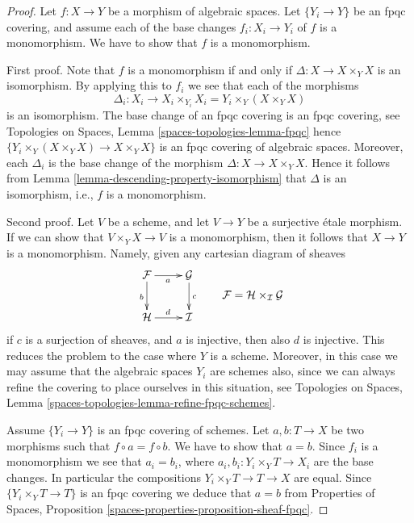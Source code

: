 \documentclass{stacks-project}
\theoremstyle{plain}
\theoremstyle{definition}
\theoremstyle{remark}
\numberwithin{equation}{subsection}
\begin{document}
\begin{proof}
Let $f : X \to Y$ be a morphism of algebraic spaces.
Let $\{Y_i \to Y\}$ be an fpqc covering, and assume
each of the base changes $f_i : X_i \to Y_i$ of $f$ is
a monomorphism. We have to show that $f$ is a monomorphism.

\medskip\noindent
First proof. Note that $f$ is a monomorphism if and only if
$\Delta : X \to X \times_Y X$ is an isomorphism. By applying this to
$f_i$ we see that each of the morphisms
$$
\Delta_i :
X_i
\longrightarrow
X_i \times_{Y_i} X_i = Y_i \times_Y (X \times_Y X)
$$
is an isomorphism. The base change of an fpqc covering is an fpqc covering, see
Topologies on Spaces, Lemma \ref{spaces-topologies-lemma-fpqc}
hence $\{Y_i \times_Y (X \times_Y X) \to X \times_Y X\}$
is an fpqc covering of algebraic spaces. Moreover, each
$\Delta_i$ is the base change of the morphism
$\Delta : X \to X \times_Y X$. Hence it follows from
Lemma \ref{lemma-descending-property-isomorphism}
that $\Delta$ is an isomorphism, i.e., $f$ is a monomorphism.

\medskip\noindent
Second proof.
Let $V$ be a scheme, and let $V \to Y$ be a surjective \'etale morphism.
If we can show that $V \times_Y X \to V$ is a monomorphism, then it
follows that $X \to Y$ is a monomorphism. Namely, given any
cartesian diagram of sheaves
$$
\vcenter{
\xymatrix{
\mathcal{F} \ar[r]_a \ar[d]_b & \mathcal{G} \ar[d]^c \\
\mathcal{H} \ar[r]^d & \mathcal{I}
}
}
\quad
\quad
\mathcal{F} = \mathcal{H} \times_\mathcal{I} \mathcal{G}
$$
if $c$ is a surjection of sheaves, and $a$ is injective, then also
$d$ is injective. This reduces the problem to the case where $Y$ is
a scheme. Moreover, in this case we may assume that the algebraic spaces
$Y_i$ are schemes also, since we can always refine the covering to place
ourselves in this situation, see
Topologies on Spaces, Lemma \ref{spaces-topologies-lemma-refine-fpqc-schemes}.

\medskip\noindent
Assume $\{Y_i \to Y\}$ is an fpqc covering of schemes.
Let $a, b : T \to X$ be two morphisms
such that $f \circ a = f \circ b$. We have to show that $a = b$.
Since $f_i$ is a monomorphism we see that $a_i = b_i$, where
$a_i, b_i : Y_i \times_Y T \to X_i$ are
the base changes. In particular the compositions
$Y_i \times_Y T \to T \to X$ are equal.
Since $\{Y_i \times_Y T \to T\}$ is an fpqc covering we
deduce that $a = b$ from Properties of Spaces, Proposition
\ref{spaces-properties-proposition-sheaf-fpqc}.
\end{proof}
\end{document}
